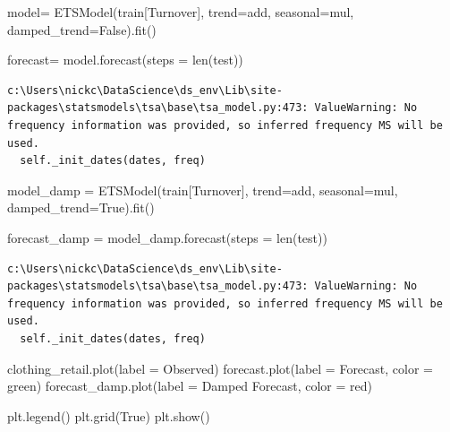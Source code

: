 \documentclass[
  11pt,
]{article}
\newenvironment{Shaded}{\begin{snugshade}}{\end{snugshade}}
\newcommand{\BuiltInTok}[1]{\textcolor[rgb]{0.00,0.23,0.31}{#1}}
\newcommand{\NormalTok}[1]{\textcolor[rgb]{0.00,0.23,0.31}{#1}}
\newcommand{\OperatorTok}[1]{\textcolor[rgb]{0.37,0.37,0.37}{#1}}
\newcommand{\StringTok}[1]{\textcolor[rgb]{0.13,0.47,0.30}{#1}}
\newcommand{\VariableTok}[1]{\textcolor[rgb]{0.07,0.07,0.07}{#1}}
\begin{document}
\begin{Shaded}
\begin{Highlighting}[]
\NormalTok{model}\OperatorTok{=}\NormalTok{ ETSModel(train[}\StringTok{\textquotesingle{}Turnover\textquotesingle{}}\NormalTok{], trend}\OperatorTok{=}\StringTok{\textquotesingle{}add\textquotesingle{}}\NormalTok{, seasonal}\OperatorTok{=}\StringTok{\textquotesingle{}mul\textquotesingle{}}\NormalTok{, damped\_trend}\OperatorTok{=}\VariableTok{False}\NormalTok{).fit()}

\NormalTok{forecast}\OperatorTok{=}\NormalTok{ model.forecast(steps }\OperatorTok{=} \BuiltInTok{len}\NormalTok{(test))}
\end{Highlighting}
\end{Shaded}

\begin{verbatim}
c:\Users\nickc\DataScience\ds_env\Lib\site-packages\statsmodels\tsa\base\tsa_model.py:473: ValueWarning: No frequency information was provided, so inferred frequency MS will be used.
  self._init_dates(dates, freq)
\end{verbatim}

\begin{Shaded}
\begin{Highlighting}[]
\NormalTok{model\_damp }\OperatorTok{=}\NormalTok{ ETSModel(train[}\StringTok{\textquotesingle{}Turnover\textquotesingle{}}\NormalTok{], trend}\OperatorTok{=}\StringTok{\textquotesingle{}add\textquotesingle{}}\NormalTok{, seasonal}\OperatorTok{=}\StringTok{\textquotesingle{}mul\textquotesingle{}}\NormalTok{, damped\_trend}\OperatorTok{=}\VariableTok{True}\NormalTok{).fit()}

\NormalTok{forecast\_damp }\OperatorTok{=}\NormalTok{ model\_damp.forecast(steps }\OperatorTok{=} \BuiltInTok{len}\NormalTok{(test))}
\end{Highlighting}
\end{Shaded}

\begin{verbatim}
c:\Users\nickc\DataScience\ds_env\Lib\site-packages\statsmodels\tsa\base\tsa_model.py:473: ValueWarning: No frequency information was provided, so inferred frequency MS will be used.
  self._init_dates(dates, freq)
\end{verbatim}

\begin{Shaded}
\begin{Highlighting}[]
\NormalTok{clothing\_retail.plot(label }\OperatorTok{=} \StringTok{\textquotesingle{}Observed\textquotesingle{}}\NormalTok{)}
\NormalTok{forecast.plot(label }\OperatorTok{=} \StringTok{\textquotesingle{}Forecast\textquotesingle{}}\NormalTok{, color }\OperatorTok{=} \StringTok{\textquotesingle{}green\textquotesingle{}}\NormalTok{)}
\NormalTok{forecast\_damp.plot(label }\OperatorTok{=} \StringTok{\textquotesingle{}Damped Forecast\textquotesingle{}}\NormalTok{, color }\OperatorTok{=} \StringTok{\textquotesingle{}red\textquotesingle{}}\NormalTok{)}

\NormalTok{plt.legend()}
\NormalTok{plt.grid(}\VariableTok{True}\NormalTok{)}
\NormalTok{plt.show()}
\end{Highlighting}
\end{Shaded}
\end{document}
